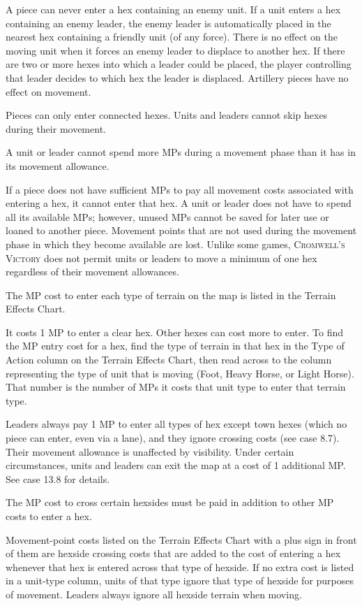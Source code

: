A piece can never enter a hex containing an enemy unit. If a unit enters a hex containing an enemy leader, the enemy leader is automatically placed in the nearest hex containing a friendly unit (of any force). There is no effect on the moving unit when it forces an enemy leader to displace to another hex. If there are two or more hexes into which a leader could be placed, the player controlling that leader decides to which hex the leader is displaced. Artillery pieces have no effect on movement.

 Pieces can only enter connected hexes. Units and leaders cannot skip hexes during their movement.

 A unit or leader cannot spend more MPs during a movement phase than it has in its movement allowance.

If a piece does not have sufficient MPs to pay all movement costs associated with entering a hex, it cannot enter that hex. A unit or leader does not have to spend all its available MPs; however, unused MPs cannot be saved for later use or loaned to another piece. Movement points that are not used during the movement phase in which they become available are lost. Unlike some games, \textsc{Cromwell's Victory} does not permit units or leaders to move a minimum of one hex regardless of their movement allowances.

 The MP cost to enter each type of terrain on the map is listed in the Terrain Effects Chart.

It costs 1 MP to enter a clear hex. Other hexes can cost more to enter. To find the MP entry cost for a hex, find the type of terrain in that hex in the Type of Action column on the Terrain Effects Chart, then read across to the column representing the type of unit that is moving (Foot, Heavy Horse, or Light Horse). That number is the number of MPs it costs that unit type to enter that terrain type.

Leaders always pay 1 MP to enter all types of hex except town hexes (which no piece can enter, even via a lane), and they ignore crossing costs (see case 8.7). Their movement allowance is unaffected by visibility. Under certain circumstances, units and leaders can exit the map at a cost of 1 additional MP. See case 13.8 for details.

 The MP cost to cross certain hexsides must be paid in addition to other MP costs to enter a hex.

Movement-point costs listed on the Terrain Effects Chart with a plus sign in front of them are hexside crossing costs that are added to the cost of entering a hex whenever that hex is entered across that type of hexside. If no extra cost is listed in a unit-type column, units of that type ignore that type of hexside for purposes of movement. Leaders always ignore all hexside terrain when moving.

